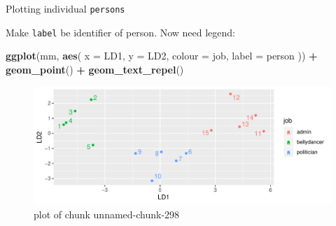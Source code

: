 \documentclass[ignorenonframetext,]{beamer}
\newenvironment{Shaded}{\begin{snugshade}}{\end{snugshade}}
\newcommand{\DataTypeTok}[1]{\textcolor[rgb]{0.13,0.29,0.53}{#1}}
\newcommand{\KeywordTok}[1]{\textcolor[rgb]{0.13,0.29,0.53}{\textbf{#1}}}
\newcommand{\NormalTok}[1]{#1}
\newcommand{\OperatorTok}[1]{\textcolor[rgb]{0.81,0.36,0.00}{\textbf{#1}}}
\newcommand{\StringTok}[1]{\textcolor[rgb]{0.31,0.60,0.02}{#1}}
\begin{document}
\begin{frame}[fragile]{Plotting individual \texttt{persons}}
\protect\hypertarget{plotting-individual-persons}{}

Make \texttt{label} be identifier of person. Now need legend:

\begin{Shaded}
\begin{Highlighting}[]
\KeywordTok{ggplot}\NormalTok{(mm, }\KeywordTok{aes}\NormalTok{(}
  \DataTypeTok{x =}\NormalTok{ LD1, }\DataTypeTok{y =}\NormalTok{ LD2,}
  \DataTypeTok{colour =}\NormalTok{ job, }\DataTypeTok{label =}\NormalTok{ person}
\NormalTok{)) }\OperatorTok{+}\StringTok{ }\KeywordTok{geom_point}\NormalTok{() }\OperatorTok{+}
\StringTok{  }\KeywordTok{geom_text_repel}\NormalTok{()}
\end{Highlighting}
\end{Shaded}

\begin{figure}
\centering
\includegraphics{figure/unnamed-chunk-298-1.pdf}
\caption{plot of chunk unnamed-chunk-298}
\end{figure}

\end{frame}
\end{document}
